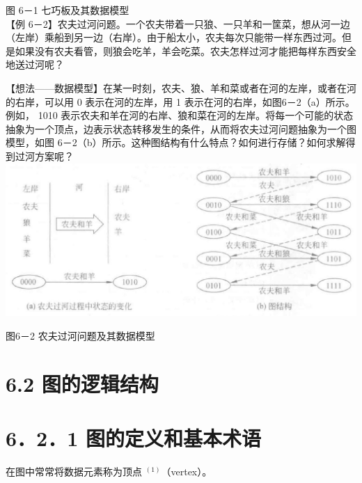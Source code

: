 \documentclass[10pt]{article}
\begin{document}
图 6－1 七巧板及其数据模型\\
【例 6－2】农夫过河问题。一个农夫带着一只狼、一只羊和一筐菜，想从河一边（左岸）乘船到另一边（右岸）。由于船太小，农夫每次只能带一样东西过河。但是如果没有农夫看管，则狼会吃羊，羊会吃菜。农夫怎样过河才能把每样东西安全地送过河呢？

【想法——数据模型】在某一时刻，农夫、狼、羊和菜或者在河的左岸，或者在河的右岸，可以用 0 表示在河的左岸，用 1 表示在河的右岸，如图6－2（a）所示。例如， 1010 表示农夫和羊在河的右岸、狼和菜在河的左岸。将每一个可能的状态抽象为一个顶点，边表示状态转移发生的条件，从而将农夫过河问题抽象为一个图模型，如图 6－2（b）所示。这种图结构有什么特点？如何进行存储？如何求解得到过河方案呢？\\
\includegraphics[max width=\textwidth, center]{2025_06_06_704745ea57b15b2333e5g-185(2)}

图6－2 农夫过河问题及其数据模型

\section*{6.2 图的逻辑结构}
\section*{6．2．1 图的定义和基本术语}
在图中常常将数据元素称为顶点 ${ }^{(1)}$（vertex）。
\end{document}
